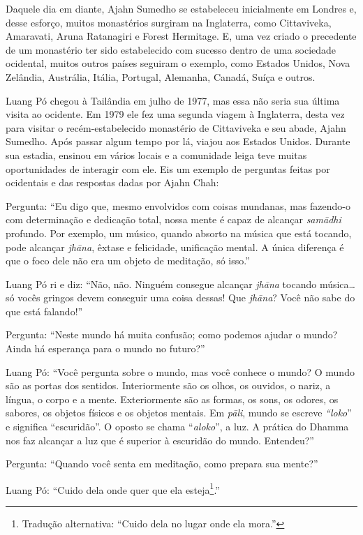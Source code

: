 Daquele dia em diante, Ajahn Sumedho se estabeleceu inicialmente em
Londres e, desse esforço, muitos monastérios surgiram na Inglaterra,
como Cittaviveka, Amaravati, Aruna Ratanagiri e Forest Hermitage. E, uma
vez criado o precedente de um monastério ter sido estabelecido com
sucesso dentro de uma sociedade ocidental, muitos outros países seguiram
o exemplo, como Estados Unidos, Nova Zelândia, Austrália, Itália,
Portugal, Alemanha, Canadá, Suíça e outros.

Luang Pó chegou à Tailândia em julho de 1977, mas essa não seria sua
última visita ao ocidente. Em 1979 ele fez uma segunda viagem à
Inglaterra, desta vez para visitar o recém-estabelecido monastério de
Cittaviveka e seu abade, Ajahn Sumedho. Após passar algum tempo por lá,
viajou aos Estados Unidos. Durante sua estadia, ensinou em vários locais
e a comunidade leiga teve muitas oportunidades de interagir com ele. Eis
um exemplo de perguntas feitas por ocidentais e das respostas dadas por
Ajahn Chah:

Pergunta: ``Eu digo que, mesmo envolvidos com coisas mundanas, mas
fazendo-o com determinação e dedicação total, nossa mente é capaz de
alcançar \emph{samādhi} profundo. Por exemplo, um músico, quando absorto
na música que está tocando, pode alcançar \emph{jhāna}, êxtase e
felicidade, unificação mental. A única diferença é que o foco dele não
era um objeto de meditação, só isso.''

Luang Pó ri e diz: ``Não, não. Ninguém consegue alcançar \emph{jhāna}
tocando música\ldots{} só vocês gringos devem conseguir uma coisa
dessas! Que \emph{jhāna}? Você não sabe do que está falando!''

Pergunta: ``Neste mundo há muita confusão; como podemos ajudar o mundo?
Ainda há esperança para o mundo no futuro?''

Luang Pó: ``Você pergunta sobre o mundo, mas você conhece o mundo? O
mundo são as portas dos sentidos. Interiormente são os olhos, os
ouvidos, o nariz, a língua, o corpo e a mente. Exteriormente são as
formas, os sons, os odores, os sabores, os objetos físicos e os objetos
mentais. Em \emph{pāli}, mundo se escreve \emph{``loko}'' e significa
``escuridão''. O oposto se chama ``\emph{aloko}'', a luz. A prática do
Dhamma nos faz alcançar a luz que é superior à escuridão do mundo.
Entendeu?''

Pergunta: ``Quando você senta em meditação, como prepara sua mente?''

Luang Pó: ``Cuido dela onde quer que ela esteja\footnote{Tradução
  alternativa: ``Cuido dela no lugar onde ela mora.''}.''

